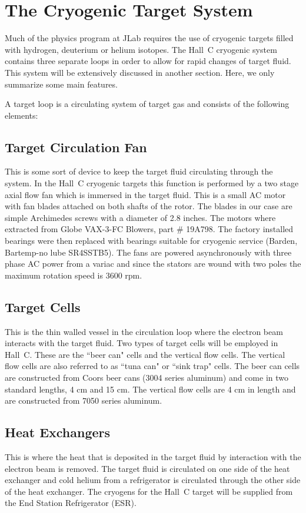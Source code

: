 \section{The Cryogenic Target System}

Much of the physics program at JLab requires the use of cryogenic targets
filled with hydrogen, deuterium or helium isotopes. The Hall~C cryogenic
system contains three separate loops in order to allow for rapid changes
of target fluid.  This system will be extensively discussed in
another section.  Here, we only summarize some main features.

A target loop is a circulating system of target gas and consists of the following
elements:

\subsection{Target Circulation Fan} This is some sort of device to keep
the target fluid circulating through the system. In the Hall~C cryogenic
targets this function is performed by a two stage axial flow fan which is
immersed in the target fluid. This is a small AC motor with fan blades attached
on both shafts of the rotor. The blades in our case are simple Archimedes
screws with a diameter of 2.8 inches. The motors where extracted from Globe
VAX-3-FC Blowers, part $\#$ 19A798. The factory installed
bearings were then replaced with bearings suitable for cryogenic service
(Barden, Bartemp-no lube SR4SSTB5). The fans are powered asynchronously
with three phase AC power from a variac and since the stators are wound with
two poles the maximum rotation speed is 3600 rpm.
\subsection{Target Cells} This is the thin walled vessel in the circulation loop
where the electron beam interacts with the target fluid. Two types
of target cells will be employed in Hall~C. These are the ``beer can" cells
and the vertical flow cells. The vertical flow cells are also referred
to as ``tuna can" or ``sink trap" cells.
The beer can cells are constructed from Coors beer cans (3004 series aluminum)
and come in two standard lengths, 4 cm and 15 cm.
The vertical flow cells are 4 cm in length and are constructed from 7050
series aluminum.
\subsection{Heat Exchangers} This is where the heat that is deposited in the target
fluid by interaction with the electron beam is removed. The target fluid is
circulated on one side of the heat exchanger and cold helium
from a refrigerator is circulated through the other side of the heat exchanger.
The cryogens for the Hall~C target will be supplied from the End Station
Refrigerator (ESR).

